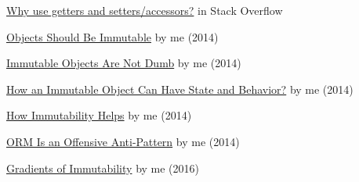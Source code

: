 \documentclass{article}
\begin{document}


\href{https://stackoverflow.com/questions/1568091/why-use-getters-and-setters-accessors}{Why use getters and setters/accessors?} in Stack Overflow

\href{https://www.yegor256.com/2014/06/09/objects-should-be-immutable.html}{Objects Should Be Immutable} by me (2014)

\href{https://www.yegor256.com/2014/12/22/immutable-objects-not-dumb.html}{Immutable Objects Are Not Dumb} by me (2014)

\href{https://www.yegor256.com/2014/12/09/immutable-object-state-and-behavior.html}{How an Immutable Object Can Have State and Behavior?} by me (2014)

\href{https://www.yegor256.com/2014/11/07/how-immutability-helps.html}{How Immutability Helps} by me (2014)

\href{https://www.yegor256.com/2014/12/01/orm-offensive-anti-pattern.html}{ORM Is an Offensive Anti-Pattern} by me (2014)

\href{https://www.yegor256.com/2016/09/07/gradients-of-immutability.html}{Gradients of Immutability} by me (2016)
\end{document}
